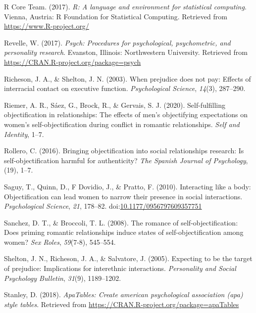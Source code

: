 \documentclass[man]{apa6}
\begin{document}
\hypertarget{ref-R-base}{}
R Core Team. (2017). \emph{R: A language and environment for statistical
computing}. Vienna, Austria: R Foundation for Statistical Computing.
Retrieved from \url{https://www.R-project.org/}

\hypertarget{ref-R-psych}{}
Revelle, W. (2017). \emph{Psych: Procedures for psychological,
psychometric, and personality research}. Evanston, Illinois:
Northwestern University. Retrieved from
\url{https://CRAN.R-project.org/package=psych}

\hypertarget{ref-richeson2003prejudice}{}
Richeson, J. A., \& Shelton, J. N. (2003). When prejudice does not pay:
Effects of interracial contact on executive function.
\emph{Psychological Science}, \emph{14}(3), 287--290.

\hypertarget{ref-riemer2020self}{}
Riemer, A. R., Sáez, G., Brock, R., \& Gervais, S. J. (2020).
Self-fulfilling objectification in relationships: The effects of men's
objectifying expectations on women's self-objectification during
conflict in romantic relationships. \emph{Self and Identity}, 1--7.

\hypertarget{ref-rollero2016bringing}{}
Rollero, C. (2016). Bringing objectification into social relationships
research: Is self-objectification harmful for authenticity? \emph{The
Spanish Journal of Psychology}, (19), 1--7.

\hypertarget{ref-saguyetal2010}{}
Saguy, T., Quinn, D., F Dovidio, J., \& Pratto, F. (2010). Interacting
like a body: Objectification can lead women to narrow their presence in
social interactions. \emph{Psychological Science}, \emph{21}, 178--82.
doi:\href{https://doi.org/10.1177/0956797609357751}{10.1177/0956797609357751}

\hypertarget{ref-sanchez2008romance}{}
Sanchez, D. T., \& Broccoli, T. L. (2008). The romance of
self-objectification: Does priming romantic relationships induce states
of self-objectification among women? \emph{Sex Roles}, \emph{59}(7-8),
545--554.

\hypertarget{ref-shelton2005expecting}{}
Shelton, J. N., Richeson, J. A., \& Salvatore, J. (2005). Expecting to
be the target of prejudice: Implications for interethnic interactions.
\emph{Personality and Social Psychology Bulletin}, \emph{31}(9),
1189--1202.

\hypertarget{ref-R-apaTables}{}
Stanley, D. (2018). \emph{ApaTables: Create american psychological
association (apa) style tables}. Retrieved from
\url{https://CRAN.R-project.org/package=apaTables}
\end{document}
